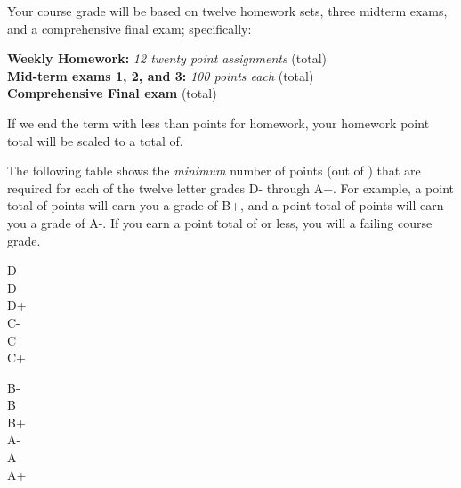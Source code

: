 \documentclass[12pt]{article}
\newcounter{hw}\setcounter{hw}{0}
\newcounter{ex}\setcounter{ex}{0}
\newenvironment{mypar}[2]
  {\begin{list}{}%
    {\setlength\leftmargin{#1}
    \setlength\rightmargin{#2}}
    \item[]}
  {\end{list}}
\begin{document}
Your course grade will be based on twelve homework sets, three midterm exams, and a comprehensive 
final exam; specifically:
\begin{mypar}{0.25in}{0.25in}
    \textbf{Weekly Homework:}  \emph{12 twenty point assignments}  \dotfill \hwpts\/ (total) \\
    \textbf{Mid-term exams 1, 2, and 3:} \emph{100 points each}  (total)\\
    \textbf{Comprehensive Final exam}  (total)
\end{mypar}
If we end the term with less than \hwpts\/ points for homework,  
your homework point total will be scaled to a total of. 






The following table shows the \emph{minimum} number of points (out of \points) that
are required for each of the twelve letter grades D- through A+. For
example, a point total of \Bp\/  points will earn you a grade of B+,  and 
a point total of \Am\/ points will earn you a grade of A-. If you earn a point
total of \F\/  or less, you will a failing course grade.
 
 \vspace{0.1in}
     \begin{minipage}{5.5in}
  \centering 
\begin{mypar}{0.25in}{0.25in}
    \begin{minipage}{2.5in}
        D-  \dotfill \Dm \\
        D \dotfill \D \\
        D+ \dotfill \Dp \\
        C- \dotfill \Cm  \\
        C \dotfill \C \\
        C+ \dotfill \Cp 
        \end{minipage}
    \phantom{xxx}
    \begin{minipage}{2.5in}
        B- \dotfill \Bm \\
        B \dotfill  \B \\
        B+ \dotfill  \Bp\\
        A- \dotfill  \Am \\
        A \dotfill  \A \\
        A+ \dotfill  \Ap
    \end{minipage}
\end{mypar} 
\end{minipage}
\end{document}
